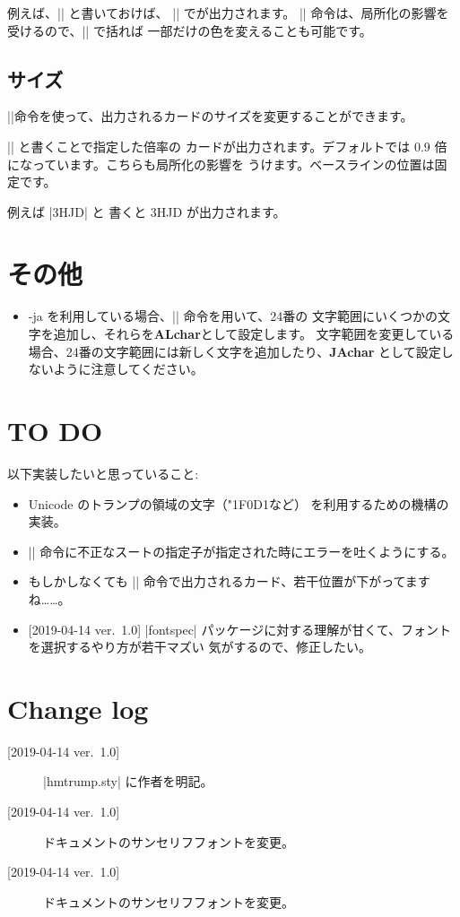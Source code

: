 \documentclass{jlreq}
\begin{document}
例えば、|| と書いておけば、
|\hmH| で{\hmH}が出力されます。
|\definecolor| 命令は、局所化の影響を受けるので、|{}| で括れば
一部だけの色を変えることも可能です。

\subsection{サイズ}
|\tizset|命令を使って、出力されるカードのサイズを変更することができます。

|| と書くことで指定した倍率の
カードが出力されます。デフォルトでは 0.9 倍になっています。こちらも局所化の影響を
うけます。ベースラインの位置は固定です。

例えば |{\trump 3H}\trump JD| と
書くと {\trump 3H}\trump JD が出力されます。

\section{その他}
\begin{itemize}
\item \LuaLaTeX-ja を利用している場合、|\ltjdefcharrange| 命令を用いて、24番の
	文字範囲にいくつかの文字を追加し、それらを\textbf{ALchar}として設定します。
	文字範囲を変更している場合、24番の文字範囲には新しく文字を追加したり、\textbf{JAchar}
	として設定しないように注意してください。
\end{itemize}
	

\section{TO DO}
以下実装したいと思っていること:
\begin{itemize}
\item Unicode のトランプの領域の文字（{\char"1F0D1}など）
	を利用するための機構の実装。
\item |\trump| 命令に不正なスートの指定子が指定された時にエラーを吐くようにする。
\item もしかしなくても |\joker| 命令で出力されるカード、若干位置が下がってますね……。
\item {[2019-04-14 ver.~1.0]} |fontspec| パッケージに対する理解が甘くて、フォントを選択するやり方が若干マズい
	気がするので、修正したい。
\end{itemize}


\section{Change log}
\begin{description}
\item[{[2019-04-14 ver.~1.0]}] |hmtrump.sty| に作者を明記。
\item[{[2019-04-14 ver.~1.0]}] ドキュメントのサンセリフフォントを変更。
\item[{[2019-04-14 ver.~1.0]}] ドキュメントのサンセリフフォントを変更。
\end{description}
\end{document}
